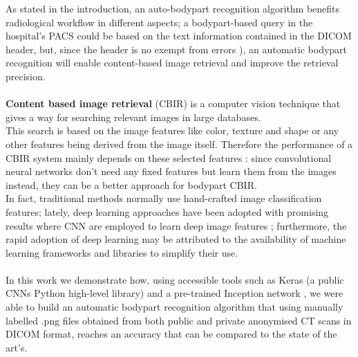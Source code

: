 \documentclass[../main.tex]{subfiles}
\begin{document}
As stated in the introduction, an auto-bodypart recognition algorithm benefits radiological workflow in different aspects; a bodypart-based query in the hospital's PACS could be based on the text information contained in the DICOM header, but, since the header is no exempt from errors  \cite{Yan2016}), an automatic bodypart recognition will enable content-based image retrieval and improve the retrieval precision. \cite{Yan2016} \\ \\
\textbf{Content based image retrieval} (CBIR) is a computer vision technique that gives a way for searching relevant images in large databases.  \\This search is based on the image features like color, texture and shape or any other features being derived from the image itself. Therefore the performance of a CBIR system mainly depends on these selected features \cite{Qayyum2017}: since convolutional neural networks don't need any fixed features but learn them from the images instead, they can be a better approach for bodypart CBIR.\\
In fact, traditional methods normally use hand-crafted image classification features; lately, deep learning approaches have been adopted with promising results where CNN are employed to learn deep image features \cite{Yan2018}; furthermore, the rapid adoption of deep learning may be attributed to the availability of machine learning frameworks and libraries to simplify their use. \cite{Lakhani2018} \\ \\
In this work we demonstrate how, using accessible tools such as Keras (a public CNNs Python high-level library) and a pre-trained Inception network \cite{Lakhani2018}, we were able to build an automatic bodypart recognition algorithm that using manually labelled .png files obtained from both public and private anonymised CT scans in DICOM format, reaches an accuracy that can be compared to the state of the art's. \cite{Qayyum2017} \cite{Yan2016} \cite{Yan2018} \cite{Wang}

\end{document}
